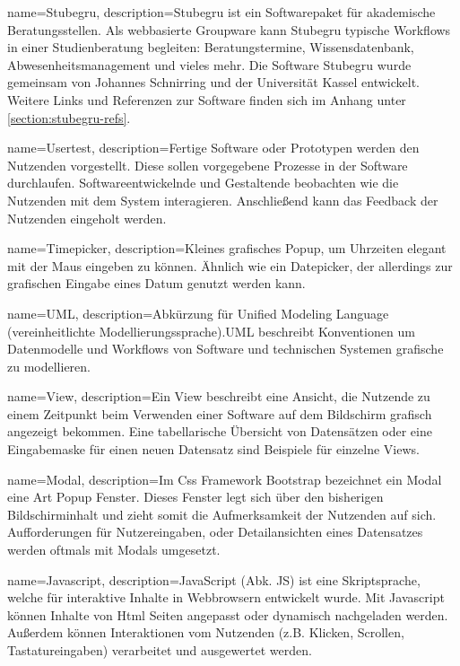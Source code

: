 \makeglossaries



{
    name=Stubegru,
    description={Stubegru ist ein Softwarepaket für akademische Beratungsstellen. Als webbasierte Groupware kann Stubegru typische Workflows in einer Studienberatung begleiten: Beratungstermine, Wissensdatenbank, Abwesenheitsmanagement und vieles mehr\cite{stubegruWebsite}. Die Software Stubegru wurde gemeinsam von Johannes Schnirring und der Universität Kassel entwickelt. Weitere Links und Referenzen zur Software finden sich im Anhang unter \ref{section:stubegru-refs}.}
}

{
    name=Usertest,
    description={Fertige Software oder Prototypen werden den Nutzenden vorgestellt. Diese sollen vorgegebene Prozesse in der Software durchlaufen. Softwareentwickelnde und Gestaltende beobachten wie die Nutzenden mit dem System interagieren. Anschließend kann das Feedback der Nutzenden eingeholt werden.}
}

{
    name=Timepicker,
    description={Kleines grafisches Popup, um Uhrzeiten elegant mit der Maus eingeben zu können. Ähnlich wie ein Datepicker, der allerdings zur grafischen Eingabe eines Datum genutzt werden kann. \cite{datepicker}}
}

{
    name=UML,
    description={Abkürzung für Unified Modeling Language (vereinheitlichte Modellierungssprache).UML beschreibt Konventionen um Datenmodelle und Workflows von Software und technischen Systemen grafische zu modellieren.\cite{UML}}
}

{
    name=View,
    description={Ein View beschreibt eine Ansicht, die Nutzende zu einem Zeitpunkt beim Verwenden einer Software auf dem Bildschirm grafisch angezeigt bekommen. Eine tabellarische Übersicht von Datensätzen oder eine Eingabemaske für einen neuen Datensatz sind Beispiele für einzelne Views.}
}

{
    name=Modal,
    description={Im \gls{Css} Framework \gls{Bootstrap} bezeichnet ein Modal eine Art Popup Fenster. Dieses Fenster legt sich über den bisherigen Bildschirminhalt und zieht somit die Aufmerksamkeit der Nutzenden auf sich. Aufforderungen für Nutzereingaben, oder Detailansichten eines Datensatzes werden oftmals mit Modals umgesetzt.}
}

{
    name=Javascript,
    description={JavaScript (Abk. JS) ist eine Skriptsprache, welche für interaktive Inhalte in Webbrowsern entwickelt wurde. Mit Javascript können Inhalte von \gls{Html} Seiten angepasst oder dynamisch nachgeladen werden. Außerdem können Interaktionen vom Nutzenden (z.B. Klicken, Scrollen, Tastatureingaben) verarbeitet und ausgewertet werden.\cite{Javascript}}
}

